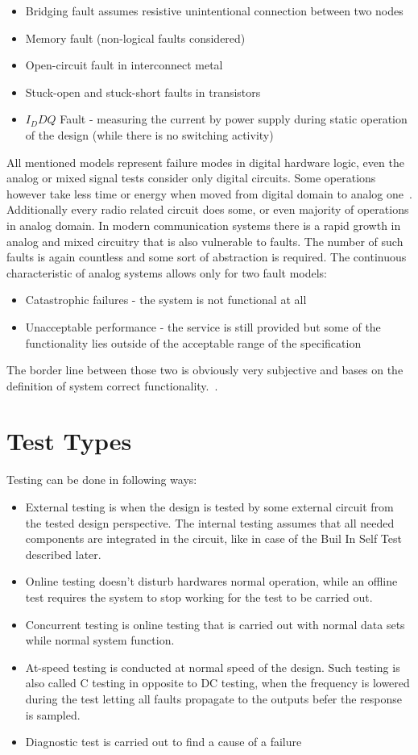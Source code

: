 \begin{itemize}
    \item Bridging fault assumes resistive unintentional connection between two nodes
    \item Memory fault (non-logical faults considered)
    \item Open-circuit fault in interconnect metal
    \item Stuck-open and stuck-short faults in transistors
    \item $I_DDQ$ Fault - measuring the current by power supply during static operation of the design (while there is no switching activity)
\end{itemize}
All mentioned models represent failure modes in digital hardware logic, even the analog or mixed signal tests consider only digital circuits. Some operations however take less time or energy when moved from digital domain to analog one~\cite{Prof Vierhaus Lectures}. Additionally every radio related circuit does some, or even majority of operations in analog domain. In modern communication systems there is a rapid growth in analog and mixed circuitry that is also vulnerable to faults. The number of such faults is again countless and some sort of abstraction is required. The continuous characteristic of analog systems allows only for two fault models:
\begin{itemize}
    \item Catastrophic failures - the system is not functional at all
    \item Unacceptable performance - the service is still provided but some of the functionality lies outside of the acceptable range of the specification
\end{itemize}
The border line between those two is obviously very subjective and bases on the definition of system correct functionality.~\cite{book:Kabisatpathy}.
\section{Test Types}
Testing can be done in following ways:
\begin{itemize}
    \item External testing is when the design is tested by some external circuit from the tested design perspective. The internal testing assumes that all needed components are integrated in the circuit, like in case of the Buil In Self Test described later.
    \item Online testing doesn't disturb hardwares normal operation, while an offline test requires the system to stop working for the test to be carried out.
    \item Concurrent testing is online testing that is carried out with normal data sets while normal system function.
    \item At-speed testing is conducted at normal speed of the design. Such testing is also called C testing in opposite to DC testing, when the frequency is lowered during the test letting all faults propagate to the outputs befer the response is sampled.
    \item Diagnostic test is carried out to find a cause of a failure
\end{itemize}

